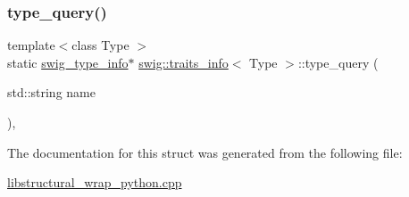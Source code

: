 \subsubsection{\texorpdfstring{type\+\_\+query()}{type\_query()}}
{\footnotesize\ttfamily template$<$class Type $>$ \\
static \hyperlink{structswig__type__info}{swig\+\_\+type\+\_\+info}$\ast$ \hyperlink{structswig_1_1traits__info}{swig\+::traits\+\_\+info}$<$ Type $>$\+::type\+\_\+query (\begin{DoxyParamCaption}\item[{std\+::string}]{name }\end{DoxyParamCaption})\hspace{0.3cm}{\ttfamily [inline]}, {\ttfamily [static]}}



The documentation for this struct was generated from the following file\+:\begin{DoxyCompactItemize}
\item 
\hyperlink{libstructural__wrap__python_8cpp}{libstructural\+\_\+wrap\+\_\+python.\+cpp}\end{DoxyCompactItemize}
